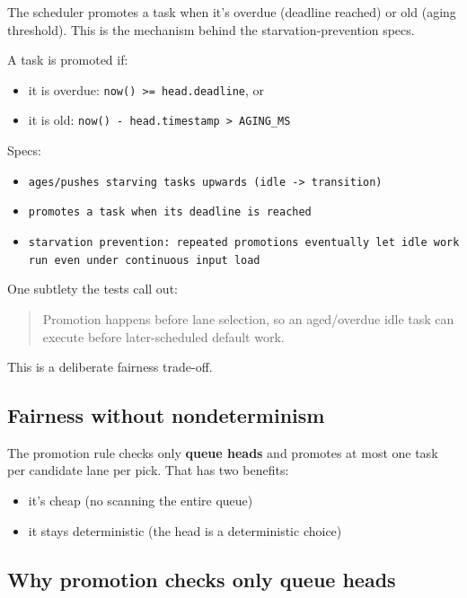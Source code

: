 The scheduler promotes a task when it's overdue (deadline reached) or old (aging threshold). This is the mechanism behind the starvation-prevention specs.

A task is promoted if:

\begin{itemize}
  \item it is overdue: \texttt{now() >= head.deadline}, or
  \item it is old: \texttt{now() - head.timestamp > AGING\_MS}
\end{itemize}

Specs:

\begin{itemize}
  \item \texttt{ages/pushes starving tasks upwards (idle -> transition)}
  \item \texttt{promotes a task when its deadline is reached}
  \item \texttt{starvation prevention: repeated promotions eventually let idle work run even under continuous input load}
\end{itemize}

One subtlety the tests call out:

\begin{quote}
Promotion happens before lane selection, so an aged/overdue idle task can execute before later-scheduled default work.
\end{quote}

This is a deliberate fairness trade-off.

\subsection{Fairness without nondeterminism}

The promotion rule checks only \textbf{queue heads} and promotes at most one task per candidate lane per pick.
That has two benefits:

\begin{itemize}
  \item it's cheap (no scanning the entire queue)
  \item it stays deterministic (the head is a deterministic choice)
\end{itemize}

\subsection{Why promotion checks only queue heads}

